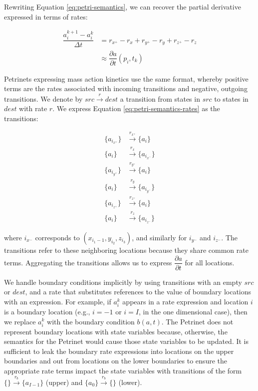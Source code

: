 \documentclass{article}
\begin{document}
\noindent Rewriting Equation \ref{eq:petri-semantics}, we can recover the
partial derivative expressed in terms of rates:

\begin{equation} \label{eq:petri-semantics-rates}
    \begin{split}
        \dfrac{a^{k+1}_{i}-a^{k}_{i}}{\Delta t}
        &=     r_{x^+} -r_x  + r_{y^+} -r_y + r_{z^+} -r_z\\
        & \approx   \dfrac{\partial a}{\partial t}(p_i, t_k)
    \end{split}
\end{equation}

Petrinets expressing mass action kinetics use the same format, whereby positive
terms are the rates associated with incoming transitions and negative, outgoing
transitions.  We denote by $src \xrightarrow{r} dest$ a transition from states
in $src$ to states in $dest$ with rate $r$.  We express Equation
\ref{eq:petri-semantics-rates} as the transitions:

\begin{equation} \label{eq:petri-semantics-transitions}
    \begin{split}
        \{a_{i_{x^+}}\}&\xrightarrow{r_{x^+}}\{a_{i}\}\\
        \{a_{i}\}&\xrightarrow{r_{x}}\{a_{i_{x^-}}\}\\
        \{a_{i_{y^+}}\}&\xrightarrow{r_{y^+}}\{a_{i}\}\\
        \{a_{i}\}&\xrightarrow{r_{y}}\{a_{i_{y^-}}\}\\
        \{a_{i_{z^+}}\}&\xrightarrow{r_{z^+}}\{a_{i}\}\\
        \{a_{i}\}&\xrightarrow{r_{z}}\{a_{i_{z^-}}\}
    \end{split}
\end{equation}

\noindent where $i_{x^-}$ corresponds to  $(x_{i_1-1}, y_{i_2}, z_{i_3})$, and
similarly for $i_{y^-}$ and $i_{z^-}$.  The transitions refer to these neighboring locations because they share common rate terms.  Aggregating the transitions allows us to express $\dfrac{\partial a}{\partial t}$ for all locations.

We handle boundary conditions implicitly by using transitions with an empty $src$ or $dest$, and a rate that substitutes references to the value of boundary locations with an expression.  For example, if $a_i^k$ appears in a rate expression and location $i$ is a boundary location (e.g., $i = -1$ or $i= I$, in the one dimensional case), then we replace $a_i^k$ with the boundary condition $b(a, t)$.  The Petrinet does not represent boundary locations with state variables because, otherwise, the semantics for the Petrinet would cause those state variables to be updated.  It is sufficient to leak the boundary rate expressions into locations on the upper boundaries and out from locations on the lower boundaries to ensure the appropriate rate terms impact the state variables with transitions of the form $\{\}\xrightarrow{r_{b}}\{a_{I-1}\}$ (upper) and $\{a_0\}\xrightarrow{r_{b}}\{\}$ (lower).
\end{document}
